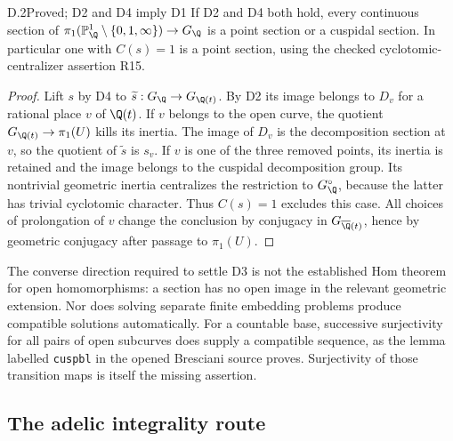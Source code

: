\begin{claim}{D.2}{Proved; D2 and D4 imply D1}
If D2 and D4 both hold, every continuous section of
$\pi_1(\mathbb P^1_\Q\setminus\{0,1,\infty\})\to G_\Q$ is a point
section or a cuspidal section. In particular one with $C(s)=1$ is a
point section, using the checked cyclotomic-centralizer assertion R15.
\end{claim}
\begin{proof}
Lift $s$ by D4 to $\widetilde s:G_\Q\to G_{\Q(t)}$.
By D2 its image belongs to $D_v$ for a rational place $v$ of
$\Q(t)$. If $v$ belongs to the open curve, the quotient
$G_{\Q(t)}\to\pi_1(U)$ kills its inertia. The image of $D_v$ is
the decomposition section at $v$, so the quotient of
$\widetilde s$ is $s_v$. If $v$ is one of the three removed
points, its inertia is retained and the image belongs to the
cuspidal decomposition group. Its nontrivial geometric inertia
centralizes the restriction to $G_\Q^\circ$, because the latter
has trivial cyclotomic character. Thus $C(s)=1$ excludes this case.
All choices of prolongation of $v$ change the conclusion by
conjugacy in $G_{\overline\Q(t)}$, hence by geometric conjugacy
after passage to $\pi_1(U)$.
\end{proof}

The converse direction required to settle D3 is not the established
Hom theorem for open homomorphisms: a section has no open image in
the relevant geometric extension. Nor does solving separate finite
embedding problems produce compatible solutions automatically.
For a countable base, successive surjectivity for all pairs of open
subcurves does supply a compatible sequence, as the lemma labelled
\texttt{cuspbl} in the opened Bresciani source proves. Surjectivity
of those transition maps is itself the missing assertion.

\subsection{The adelic integrality route}

